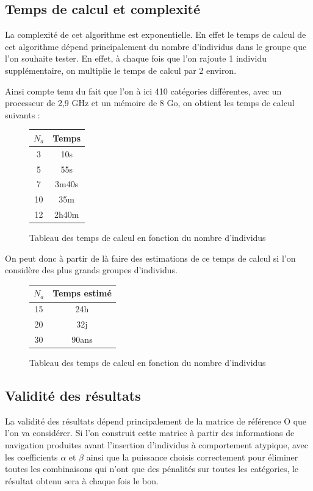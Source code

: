 \documentclass[a4paper, 11pt]{article}
\begin{document}
\subsection{Temps de calcul et complexité}

La complexité de cet algorithme est exponentielle. En effet le temps de calcul de cet algorithme dépend principalement du nombre d'individus dans le groupe que l'on souhaite tester. En effet, à chaque fois que l'on rajoute 1 individu supplémentaire, on multiplie le temps de calcul par 2 environ.

Ainsi compte tenu du fait que l'on à ici 410 catégories différentes, avec un processeur de 2,9 GHz et un mémoire de 8 Go, on obtient les temps de calcul suivants :

\begin{figure}[h!]
\center
\begin{tabular}{|c|c|}
\hline
$N_a$ & Temps\\
\hline
3 & 10s\\
\hline
5 & 55s\\
\hline
7 & 3m40s\\
\hline
10 & 35m\\
\hline
12 & 2h40m\\
\hline
\end{tabular}
\caption{Tableau des temps de calcul en fonction du nombre d'individus}
\end{figure}

On peut donc à partir de là faire des estimations de ce temps de calcul si l'on considère des plus grands groupes d'individus.

\begin{figure}[h!]
\center
\begin{tabular}{|c|c|}
\hline
$N_a$ & Temps estimé\\
\hline
15 & 24h\\
\hline
20 & 32j\\
\hline
30 & 90ans\\
\hline
\end{tabular}
\caption{Tableau des temps de calcul en fonction du nombre d'individus}
\end{figure}

\subsection{Validité des résultats}

La validité des résultats dépend principalement de la matrice de référence O que l'on va considérer. Si l'on construit cette matrice à partir des informations de navigation produites avant l'insertion d'individus à comportement atypique, avec les coefficients $\alpha$ et $\beta$ ainsi que la puissance choisis correctement pour éliminer toutes les combinaisons qui n'ont que des pénalités sur toutes les catégories, le résultat obtenu sera à chaque fois le bon. 
\end{document}

